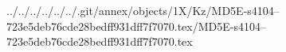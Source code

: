 ../../../../../../.git/annex/objects/1X/Kz/MD5E-s4104--723e5deb76cde28bedff931dff7f7070.tex/MD5E-s4104--723e5deb76cde28bedff931dff7f7070.tex